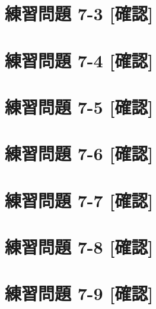 \documentclass[
]{book}
\begin{document}
\hypertarget{ux7df4ux7fd2ux554fux984c-7-3-ux78baux8a8d}{%
\section*{練習問題 7-3 {[}確認{]}}\label{ux7df4ux7fd2ux554fux984c-7-3-ux78baux8a8d}}

\hypertarget{ux7df4ux7fd2ux554fux984c-7-4-ux78baux8a8d}{%
\section*{練習問題 7-4 {[}確認{]}}\label{ux7df4ux7fd2ux554fux984c-7-4-ux78baux8a8d}}

\hypertarget{ux7df4ux7fd2ux554fux984c-7-5-ux78baux8a8d}{%
\section*{練習問題 7-5 {[}確認{]}}\label{ux7df4ux7fd2ux554fux984c-7-5-ux78baux8a8d}}

\hypertarget{ux7df4ux7fd2ux554fux984c-7-6-ux78baux8a8d}{%
\section*{練習問題 7-6 {[}確認{]}}\label{ux7df4ux7fd2ux554fux984c-7-6-ux78baux8a8d}}

\hypertarget{ux7df4ux7fd2ux554fux984c-7-7-ux78baux8a8d}{%
\section*{練習問題 7-7 {[}確認{]}}\label{ux7df4ux7fd2ux554fux984c-7-7-ux78baux8a8d}}

\hypertarget{ux7df4ux7fd2ux554fux984c-7-8-ux78baux8a8d}{%
\section*{練習問題 7-8 {[}確認{]}}\label{ux7df4ux7fd2ux554fux984c-7-8-ux78baux8a8d}}

\hypertarget{ux7df4ux7fd2ux554fux984c-7-9-ux78baux8a8d}{%
\section*{練習問題 7-9 {[}確認{]}}\label{ux7df4ux7fd2ux554fux984c-7-9-ux78baux8a8d}}
\end{document}
